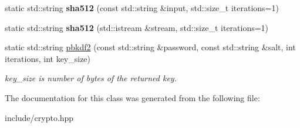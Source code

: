 \begin{DoxyCompactItemize}
\item 
static std\+::string {\bfseries sha512} (const std\+::string \&input, std\+::size\+\_\+t iterations=1)\hypertarget{classSimpleWeb_1_1Crypto_a8ea21040d2822e355e490e7576ecbabb}{}\label{classSimpleWeb_1_1Crypto_a8ea21040d2822e355e490e7576ecbabb}

\item 
static std\+::string {\bfseries sha512} (std\+::istream \&stream, std\+::size\+\_\+t iterations=1)\hypertarget{classSimpleWeb_1_1Crypto_a588c2b1c551c049b92afafbdfe6b6f75}{}\label{classSimpleWeb_1_1Crypto_a588c2b1c551c049b92afafbdfe6b6f75}

\item 
static std\+::string \hyperlink{classSimpleWeb_1_1Crypto_a53d0a191ebda80d31c291260343e38fe}{pbkdf2} (const std\+::string \&password, const std\+::string \&salt, int iterations, int key\+\_\+size)\hypertarget{classSimpleWeb_1_1Crypto_a53d0a191ebda80d31c291260343e38fe}{}\label{classSimpleWeb_1_1Crypto_a53d0a191ebda80d31c291260343e38fe}

\begin{DoxyCompactList}\small\item\em key\+\_\+size is number of bytes of the returned key. \end{DoxyCompactList}\end{DoxyCompactItemize}


The documentation for this class was generated from the following file\+:\begin{DoxyCompactItemize}
\item 
include/crypto.\+hpp\end{DoxyCompactItemize}

